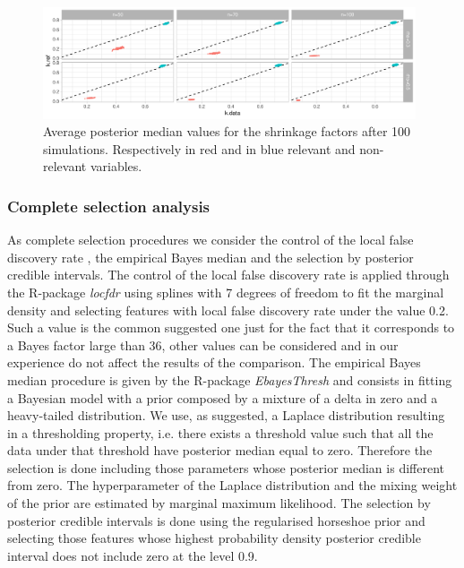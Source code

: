 \documentclass[american,]{article}
\theoremstyle{definition}
\begin{document}
\begin{figure}[tp]
  \centering
  \includegraphics[width=0.98\textwidth]{graphics/k.pdf}
  \caption{Average posterior median values for the shrinkage factors after 100 simulations. Respectively in red and in blue relevant and non-relevant variables.\\}
  \label{fig:k}
\end{figure}


\hypertarget{complete-selection}{%
\subsubsection{Complete selection analysis}\label{complete-selection}}
As complete selection procedures we consider the control of the local false discovery rate \citep{paper:efron, book:efron}, the empirical Bayes median \citep{paper:EBmed} and the selection by posterior credible intervals. The control of the local false discovery rate is applied through the R-package \textit{locfdr} using splines with 7 degrees of freedom to fit the marginal density and selecting features with local false discovery rate under the value 0.2. Such a value is the common suggested one just for the fact that it corresponds to a Bayes factor large than 36, other values can be considered and in our experience do not affect the results of the comparison. The empirical Bayes median procedure is given by the R-package \textit{EbayesThresh} and consists in fitting a Bayesian model with a prior composed by a mixture of a delta in zero and a heavy-tailed distribution. We use, as suggested, a Laplace distribution resulting in a thresholding property, i.e. there exists a threshold value such that all the data under that threshold have posterior median equal to zero. Therefore the selection is done including those parameters whose posterior median is different from zero. The hyperparameter of the Laplace distribution and the mixing weight of the prior are estimated by marginal maximum likelihood. The selection by posterior credible intervals is done using the regularised horseshoe prior and selecting those features whose highest probability density posterior credible interval does not include zero at the level 0.9.
\end{document}
